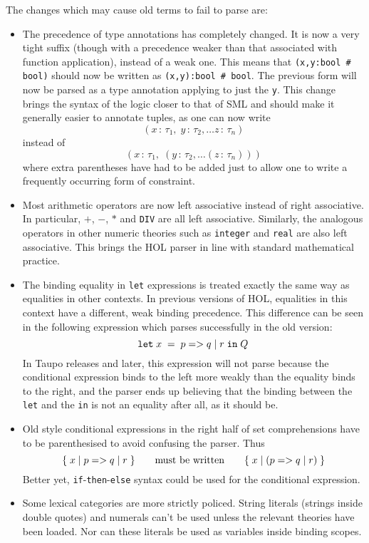 {The changes which may cause old terms to fail to parse are:
\begin{itemize}
\newcommand\condexp{\mbox{$p \; {\tt =>} \; q \; {\tt |} \; r$}}
\item The precedence of type annotations has completely changed.  It
  is now a very tight suffix (though with a precedence weaker than
  that associated with function application), instead of a weak one.
  This means that \mbox{\tt (x,y:bool \# bool)} should now be written
  as \mbox{\tt (x,y):bool \# bool}. The previous form will now be
  parsed as a type annotation applying to just the \verb+y+.  This
  change brings the syntax of the logic closer to that of SML and
  should make it generally easier to annotate tuples, as one can now
  write \[ (x\,:\,\tau_1,\;y\,:\,\tau_2,\dots z\,:\,\tau_n)
  \] instead of \[
  (x\,:\,\tau_1, \;(y\,:\,\tau_2, \dots (z\,:\,\tau_n)))
  \] where extra parentheses have had to be added just to allow one to
  write a frequently occurring form of constraint.
\item Most arithmetic operators are now left associative instead of
  right associative.  In particular, $+$, $-$, $*$ and {\tt DIV} are
  all left associative.  Similarly, the analogous operators in other
  numeric theories such as {\tt integer} and {\tt real} are also left
  associative.  This brings the HOL parser in line with standard
  mathematical practice.
\item The binding equality in {\tt let} expressions is treated exactly
  the same way as equalities in other contexts.  In previous versions
  of HOL, equalities in this context have a different, weak binding
  precedence.  This difference can be seen in the following expression
  which parses successfully in the old version:
  \[ {\tt let} \; x \; = \; \condexp \; {\tt
  in} \;Q \] In Taupo releases and later, this expression will not
  parse because the conditional expression binds to the left more
  weakly than the equality binds to the right, and the parser ends up
  believing that the binding between the \verb+let+ and the \verb+in+
  is not an equality after all, as it should be.
\item Old style conditional expressions in the right half of set
  comprehensions have to be parenthesised to avoid confusing the
  parser.  Thus \[
  \{ \; x \; | \; \condexp \; \}
   \qquad\mbox{must be written} \qquad
  \{ \; x \; | \; (\condexp) \; \}
  \] Better yet, {\tt if}-{\tt then}-{\tt else} syntax could be used
  for the conditional expression.
\item Some lexical categories are more strictly policed.  String
  literals (strings inside double quotes) and numerals can't be used
  unless the relevant theories have been loaded.  Nor can these
  literals be used as variables inside binding scopes.
\end{itemize}

}
